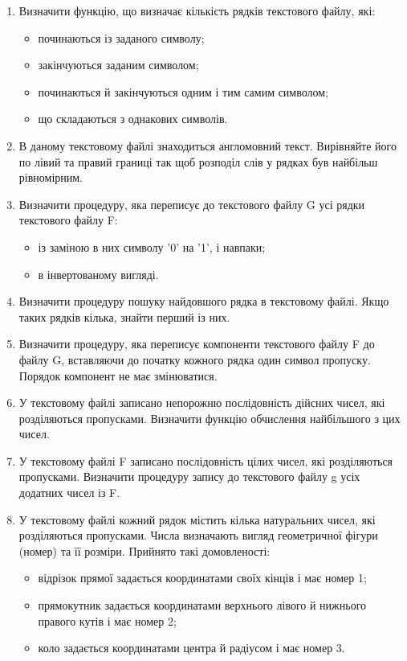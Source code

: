 \documentclass[]{article}
\makeatletter
\newcommand{\xslalph}[1]{\expandafter\@xslalph\csname c@#1\endcsname}
\newcommand{\@xslalph}[1]{%
    \ifcase#1\or а\or б\or в\or г\or д\or e\or є\or ж\or з\or i%
    \or й\or к\or л\or м\or н\or о\or п\or р\or с\or т%
    \or у\or ф\or х\or ц\or ч\or ш\or ю\or я\or аа\or бб\or вв%
    \else\@ctrerr\fi%
}
\makeatother
\begin{document}
\begin{enumerate}
\begin{enumerate}[label=\xslalph*)]
\begin{enumerate}
\begin{enumerate}[label=\xslalph*)]
\begin{enumerate}
\item
Визначити функцію, що визначає кількість рядків текстового файлу,
які:
\begin{itemize}
\item починаються із заданого символу;
\item закінчуються заданим символом;
\item починаються й закінчуються одним і тим самим символом;
\item що складаються з однакових символів.
\end{itemize}

\item
В даному текстовому файлі знаходиться англомовний текст. Вирівняйте
його по лівий та правий границі так щоб розподіл слів у рядках був
найбільш рівномірним.

\item
Визначити процедуру, яка переписує до текстового файлу G усі 
рядки текстового файлу F:
\begin{itemize}
\item із заміною в них символу '0' на '1', і навпаки;
\item в інвертованому вигляді.
\end{itemize}

\item
Визначити процедуру пошуку найдовшого рядка в текстовому файлі.
Якщо таких рядків кілька, знайти перший із них.
\item
Визначити процедуру, яка переписує компоненти текстового 
файлу F до файлу G, вставляючи до початку кожного рядка один символ пропуску.
Порядок компонент не має змінюватися.
\item
У текстовому файлі записано непорожню послідовність дійсних чисел,
які розділяються пропусками. Визначити функцію обчислення найбільшого з
цих чисел.

\item
У текстовому файлі F записано послідовність цілих чисел, які розділяються пропусками. 
Визначити процедуру запису до текстового файлу g усіх додатних чисел із F.

\item
У текстовому файлі кожний рядок містить кілька натуральних чисел, які розділяються пропусками.
Числа визначають вигляд геометричної фігури (номер) та її розміри. Прийнято такі домовленості:
\begin{itemize}
\item
відрізок прямої задається координатами своїх кінців і має номер 1;
\item
прямокутник задається координатами верхнього лівого й нижнього правого кутів і має номер 2;
\item
коло задається координатами центра й радіусом і має номер 3.
\end{itemize}


\end{enumerate}
\end{enumerate}
\end{enumerate}
\end{enumerate}
\end{enumerate}
\end{document}

